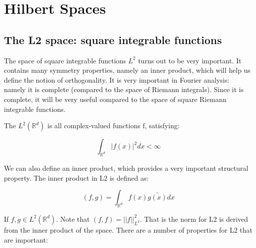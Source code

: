 \documentclass[class=article, crop=false]{standalone}
\begin{document}
\section{Hilbert Spaces}
	\subsection{The L2 space: square integrable functions}
		The space of square integrable functions $L^2$ turns out to be very important. It contains many symmetry properties, namely an inner product, which will help us define the notion of orthogonality. It is very important in Fourier analysis: namely it is complete (compared to the space of Riemann integrals). Since it is complete, it will be very useful compared to the space of square Riemann integrable functions.

		\begin{definition} [L2 - norm]
			The $L^2(\mathbb{R}^d)$ is all complex-valued functions f, satisfying:

				$$\int_{\mathbb{R}^d} |f(x)|^2 dx < \infty$$

		\end{definition}

		We can also define an inner product, which provides a very important structural property. The inner product in L2 is defined as:

			$$(f, g) = \int_{\mathbb{R}^d} f(x) \bar{g(x)} dx$$

		If $f, g \in L^2(\mathbb{R}^d)$. Note that $(f,f) = ||f||_{L^2}^2$. That is the norm for L2 is derived from the inner product of the space. There are a number of properties for L2 that are important:
\end{document}
